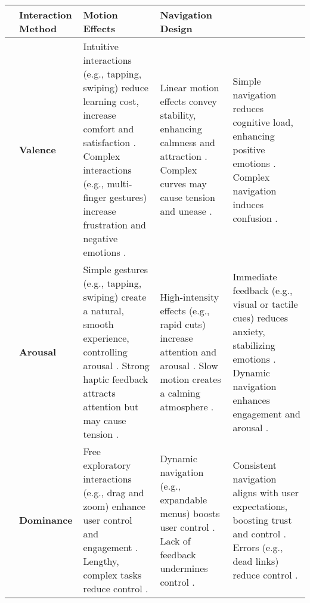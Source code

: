 \renewcommand{\arraystretch}{1.6} %
\captionsetup{font=small}

\begin{table*}[ht]
\fontsize{8}{9}\selectfont
\centering
\begin{tabularx}{\textwidth}{|>{\centering\arraybackslash}m{0.6cm}|>{\centering\arraybackslash}m{1.55cm}|>{\centering\arraybackslash}m{4.6cm}|>{\centering\arraybackslash}m{4.6cm}|>{\centering\arraybackslash}m{4.6cm}|} 
\hline
\rowcolor[HTML]{D9EAD3} 
\multicolumn{2}{|c|}{\textbf{Dimension}} & \textbf{Interaction Method} & \textbf{Motion Effects} & \textbf{Navigation Design} \\ \hline

\multirow{3}{*}{\rotatebox{90}{\parbox{3cm}{\centering \textbf{Emotional \\ Dimensions}}}} & 
\cellcolor[HTML]{FDF6E8} \textbf{Valence} & 
Intuitive interactions (e.g., tapping, swiping) reduce learning cost, increase comfort and satisfaction \cite{sundar2014user, amoor2014designing}.  Complex interactions (e.g., multi-finger gestures) increase frustration and negative emotions \cite{sundar2014user}. & 
Linear motion effects convey stability, enhancing calmness and attraction \cite{lockyer2012affective}. Complex curves may cause tension and unease \cite{lockyer2012affective}. & 
Simple navigation reduces cognitive load, enhancing positive emotions \cite{wang2024enhancing, abdelaal2023accessibility}. Complex navigation induces confusion \cite{sheng2012effects}.\\ \cline{2-5}

& \cellcolor[HTML]{FDF6E8} \textbf{Arousal} & 
Simple gestures (e.g., tapping, swiping) create a natural, smooth experience, controlling arousal \cite{wodehouse2014exploring}. Strong haptic feedback attracts attention but may cause tension \cite{olugbade2023touch}. &  
High-intensity effects (e.g., rapid cuts) increase attention and arousal \cite{hanjalic2005affective}. Slow motion creates a calming atmosphere \cite{wollner2018slow}. & 
Immediate feedback (e.g., visual or tactile cues) reduces anxiety, stabilizing emotions \cite{sundar2014user, wang2024enhancing}. Dynamic navigation enhances engagement and arousal \cite{amoor2014designing}. \\ \cline{2-5}

& \cellcolor[HTML]{FDF6E8} \textbf{Dominance} & 
Free exploratory interactions (e.g., drag and zoom) enhance user control and engagement \cite{amoor2014designing}.  Lengthy, complex tasks reduce control \cite{wang2024enhancing}. & 
Dynamic navigation (e.g., expandable menus) boosts user control \cite{amoor2014designing}. Lack of feedback undermines control \cite{wang2024enhancing}. & 
Consistent navigation aligns with user expectations, boosting trust and control \cite{abdelaal2023accessibility}. Errors (e.g., dead links) reduce control \cite{sheng2012effects}. \\ \hline


\end{tabularx}
\end{table*}
